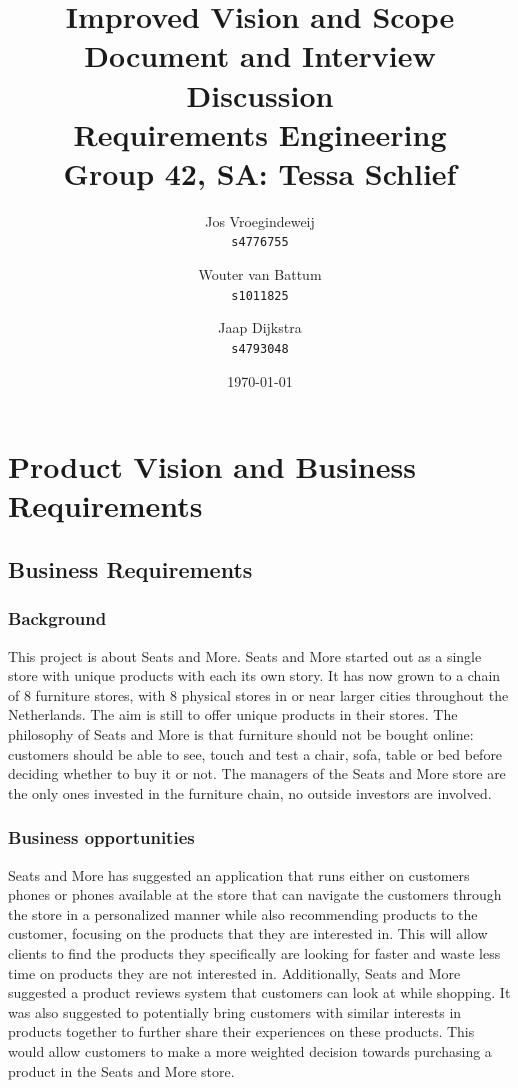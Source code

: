 \documentclass[a4paper]{article}
\title{\textbf{Improved Vision and Scope Document and Interview Discussion}\\\large Requirements Engineering\\Group 42, SA: Tessa Schlief}
\author{Jos Vroegindeweij\\\texttt{s4776755} \and Wouter van Battum\\\texttt{s1011825}
\and Jaap Dijkstra\\\texttt{s4793048}}
\date{\today}
\begin{document}
\maketitle
\color{black}
\section{Product Vision and Business Requirements}
\subsection*{Business Requirements}
\subsubsection*{Background}
This project is about Seats and More. \color{blue}Seats and More started out as a single store with unique products with each its own story. It has now grown to a chain of 8 furniture stores, \color{black}with 8 physical stores in or near larger cities throughout the Netherlands. \color{blue} The aim is still to offer unique products in their stores. \color{black} The philosophy of Seats and More is that furniture should not be bought online: customers should be able to see, touch and test a chair, sofa, table or bed before deciding whether to buy it or not. \color{blue} The managers of the Seats and More store are the only ones invested in the furniture chain, no outside investors are involved. \color{black}

\subsubsection*{Business opportunities}
Seats and More has suggested an application that runs either on customers phones or phones available at the store that can navigate the customers through the store in a personalized manner while also recommending products to the customer, focusing on the products that they are interested in. This will allow clients to find the products they specifically are looking for faster and waste less time on products they are not interested in. Additionally, Seats and More suggested a product reviews system that customers can look at while shopping. It was also suggested to potentially bring customers with similar interests in products together to further share their experiences on these products. This would allow customers to make a more weighted decision towards purchasing a product in the Seats and More store.
\end{document}

